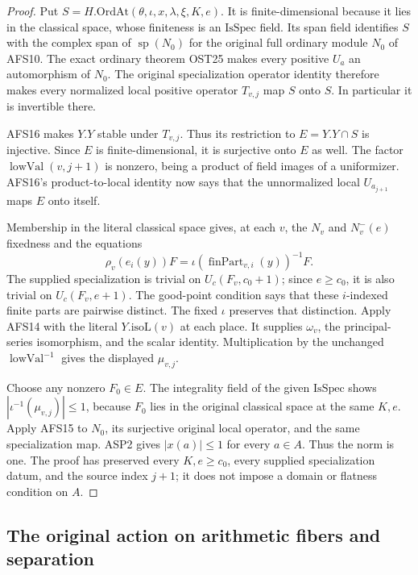 \documentclass[11pt,a4paper]{article}
\numberwithin{equation}{section}
\theoremstyle{remark}\newtheorem{remark}[theorem]{Remark}
\begin{document}
\begin{proof}
Put $S=H.\mathrm{OrdAt}(\theta,\iota,x,\lambda,\xi,K,e)$.
It is finite-dimensional because it lies in the classical
space, whose finiteness is an $\mathrm{IsSpec}$ field.
Its span field identifies $S$ with the complex span of
$\operatorname{sp}(N_0)$ for the original full ordinary
module $N_0$ of AFS10.  The exact ordinary theorem OST25
makes every positive $U_a$ an automorphism of $N_0$.
The original specialization operator identity therefore
makes every normalized local positive operator $T_{v,j}$
map $S$ onto $S$.  In particular it is invertible there.

AFS16 makes $Y.Y$ stable under $T_{v,j}$.  Thus its
restriction to $E=Y.Y\cap S$ is injective.  Since $E$ is
finite-dimensional, it is surjective onto $E$ as well.
The factor $\operatorname{lowVal}(v,j+1)$ is nonzero,
being a product of field images of a uniformizer.
AFS16's product-to-local identity now says that the
unnormalized local $U_{a_{j+1}}$ maps $E$ onto itself.

Membership in the literal classical space gives, at each
$v$, the $N_v$ and $N_v^-(e)$ fixedness and the equations
\[
 \rho_v(e_i(y))F=
             \iota(\operatorname{finPart}_{v,i}(y))^{-1}F.
\]
The supplied specialization is trivial on $U_c(F_v,c_0+1)$;
since $e\geq c_0$, it is also trivial on $U_c(F_v,e+1)$.
The good-point condition says that these $i$-indexed
finite parts are pairwise distinct.  The fixed $\iota$
preserves that distinction.  Apply AFS14 with the literal
$Y.\mathrm{isoL}(v)$ at each place.  It supplies $\omega_v$,
the principal-series isomorphism, and the scalar identity.
Multiplication by the unchanged $\operatorname{lowVal}^{-1}$
gives the displayed $\mu_{v,j}$.

Choose any nonzero $F_0\in E$.  The integrality field of
the given $\mathrm{IsSpec}$ shows
$|\iota^{-1}(\mu_{v,j})|\leq1$, because $F_0$ lies in
the original classical space at the same $K,e$.
Apply AFS15 to $N_0$, its surjective original local
operator, and the same specialization map.  ASP2 gives
$|x(a)|\leq1$ for every $a\in A$.  Thus the norm is one.
The proof has preserved every $K,e\geq c_0$, every
supplied specialization datum, and the source index
$j+1$; it does not impose a domain or flatness condition
on $A$.
\end{proof}

\subsection{The original action on arithmetic fibers and separation}
\end{document}
